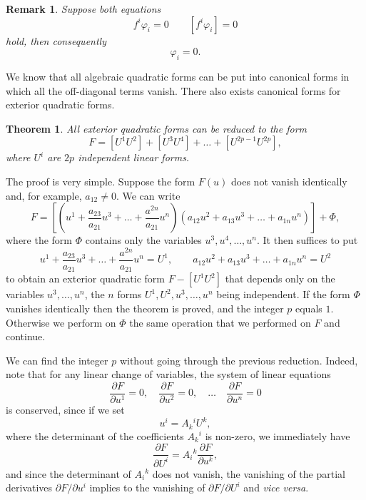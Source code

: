 \documentclass[leqno,11pt]{book}
\numberwithin{equation}{chapter}
\newcommand{\pd}{\partial}
\theoremstyle{shape1}
\newtheorem*{thm*}{\hspace{15pt}Theorem}
\theoremstyle{shape0}
\newtheorem*{rmk*}{\hspace{15pt}Remark}
\theoremstyle{shape2}
\theoremstyle{definition}
\begin{document}
\begin{rmk*}
  Suppose both equations
\[
f^{i}\varphi_{i}=0\qquad[f^{i}\varphi_{i}]=0
\]
hold, then consequently
\[
\varphi_{i}=0.
\]
\end{rmk*}

\vspace{12pt}\fsec We know that all algebraic quadratic forms can be put into canonical forms in which all the off-diagonal terms vanish. There also exists canonical forms for exterior quadratic forms.

\begin{thm*}
  All exterior quadratic forms can be reduced to the form
  \begin{equation}
    \label{eq:6}
    F=[U^{1}U^{2}]+[U^{3}U^{4}]+\dots+[U^{2p-1}U^{2p}],
  \end{equation}
where $U^{i}$ are $2p$ independent linear forms.
\end{thm*}

The proof is very simple. Suppose the form $F(u)$ does not vanish identically and, for example, $a_{12}\neq 0$. We can write
\[
F=\left[\left(u^{1}+\frac{a_{23}}{a_{21}}u^{3}+\dots+\frac{a^{2n}}{a_{21}}u^{n}\right)(a_{12}u^{2}+a_{13}u^{3}+\dots+a_{1n}u^{n})\right]+\Phi,
\]
where the form $\Phi$ contains only the variables $u^{3},u^{4}, \dots, u^{n}$. It  then suffices to put
\[
u^{1}+\frac{a_{23}}{a_{21}}u^{3}+\dots+\frac{a^{2n}}{a_{21}}u^{n}=U^{1},\qquad a_{12}u^{2}+a_{13}u^{3}+\dots+a_{1n}u^{n}=U^{2}
\]
to obtain an exterior quadratic form $F-[U^{1}U^{2}]$ that depends only on the variables $u^{3},\dots,u^{n}$, the $n$ forms $U^{1},U^{2},u^{3},\dots,u^{n}$ being independent. If the form $\Phi$ vanishes identically then the theorem is proved, and the integer $p$ equals $1$. Otherwise we perform on $\Phi$ the same operation that we performed on $F$ and continue.

We can find the integer $p$ without going through the previous reduction. Indeed, note that for any linear change of  variables, the system of linear equations
\begin{equation}
  \label{eq:7}
  \frac{\pd F}{\pd u^{1}}=0,\quad \frac{\pd F}{\pd u^{2}}=0,\quad \dots\quad\frac{\pd F}{\pd u^{n}}=0
\end{equation}
is conserved, since if we set
\[
u^{i}=A_{k}{}^{i}U^{k},
\]
where the determinant of the coefficients $A_{k}{}^{i}$ is non-zero, we immediately  have
\[
\frac{\pd F}{\pd U^{i}}=A_{i}{}^{k}\frac{\pd F}{\pd u^{k}},
\]
and since the determinant of $A_{i}{}^{k}$ does not vanish, the vanishing of the partial derivatives $\pd F/\pd u^{i}$ implies to the vanishing of $\pd F/\pd U^{i}$ and \emph{vice versa}.
\end{document}
